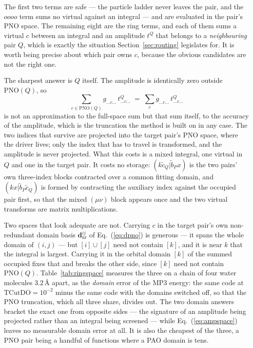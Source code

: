 \documentclass[aip,jcp,amsmath,amssymb,preprint,superscriptaddress]{revtex4-2}%
\newcommand{\pao}[1]{\tilde{#1}}
\begin{document}
The first two terms are safe --- the particle ladder never leaves the pair,
and the $oooo$ term sums no virtual against an integral --- and are evaluated
in the pair's PNO space. The remaining eight are the ring terms, and each of
them sums a virtual $c$ between an integral and an amplitude $t^{Q}$ that
belongs to a \emph{neighbouring} pair $Q$, which is exactly the situation
Section~\ref{sec:routing} legislates for. It is worth being precise about
which pair owns $c$, because the obvious candidates are not the right one.

The sharpest answer is $Q$ itself. The amplitude is identically zero outside
$\mathrm{PNO}(Q)$, so
%
\begin{equation}
  \sum_{c \in \mathrm{PNO}(Q)} g_{\ldots c \ldots}\, t^{Q}_{\ldots c \ldots}
  \;=\; \sum_{c} g_{\ldots c \ldots}\, t^{Q}_{\ldots c \ldots}
  \label{eq:ampspace}
\end{equation}
%
is not an approximation to the full-space sum but that sum itself, to the
accuracy of the amplitude, which is the truncation the method is built on in
any case. The two indices that survive are projected into the target pair's
PNO space, where the driver lives; only the index that has to travel is
transformed, and the amplitude is never projected. What this costs is a mixed
integral, one virtual in $Q$ and one in the target pair. It costs no storage:
$(k\pao{c}_{Q}|\pao{b}_{P}x)$ is the two pairs' own three-index blocks
contracted over a common fitting domain, and
$(kx|\pao{b}_{P}\pao{c}_{Q})$ is formed by contracting the auxiliary index
against the occupied pair first, so that the mixed $(\mu\nu)$ block appears
once and the two virtual transforms are matrix multiplications.

Two spaces that look adequate are not. Carrying $c$ in the target pair's own
non-redundant domain basis $\mathbf{d}^{ij}_{\text{nr}}$ of
Eq.~(\ref{eq:dpno}) is generous --- it spans the whole domain of $(i,j)$ ---
but $[i]\cup[j]$ need not contain $[k]$, and it is near $k$ that the integral
is largest. Carrying it in the orbital domain $[k]$ of the summed occupied
fixes that and breaks the other side, since $[k]$ need not contain
$\mathrm{PNO}(Q)$. Table~\ref{tab:ringspace} measures the three on a chain of
four water molecules $3.2\,\text{\AA}$ apart, as the \emph{domain} error of
the MP3 energy: the same code at $\text{TCutDO}=10^{-2}$ minus the same code
with the domains switched off, so that the PNO truncation, which all three
share, divides out. The two domain answers bracket the exact one from opposite
sides --- the signature of an amplitude being projected rather than an
integral being screened --- while Eq.~(\ref{eq:ampspace}) leaves no measurable
domain error at all. It is also the cheapest of the three, a PNO pair being a
handful of functions where a PAO domain is tens.
\end{document}
